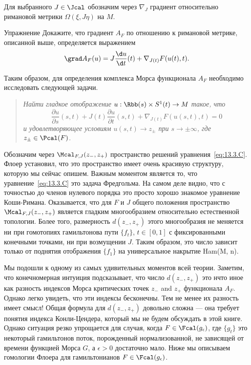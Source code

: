 Для выбранного $J\in\Jcal$ обозначим через $\nabla_{J}$ градиент
относительно римановой метрики $\Omega(\xi,J\eta)$ на $M$.
\begin{ex}{Упражнение}\label{13.3.B}
  Докажите, что градиент $A_{F}$ по отношению к римановой метрике,
  описанной выше, определяется выражением 
  \[
  \grad A_{F}(u)=J\frac{\d u}{\d t}(t)+\nabla_{J(t)}F(u(t),t).
  \]
\end{ex}
Таким образом, для определения комплекса Морса функционала $A_{F}$
необходимо исследовать  следующей задачи.
\begin{quote}\em
  Найти гладкое отображение $u : \Rbb(s)\times S^{1}(t)\to M$ такое,
  что
  \begin{equation}\label{eq:13.3.C}
    \frac{\partial u}{\partial s}(s,t) +
    J(t)\frac{\partial u}{\partial t}(s,t) +
    \nabla_{J(t)}F(u(s,t),t) = 0
  \end{equation}
  и удовлетворяющее условиям $u(s,t)\to z_{\pm}$ при $s\to\pm\infty$,
  где $z_{\pm}\in\Pcal(F)$.
\end{quote}
Обозначим через $\Mcal_{F,J}(z_{-},z_{+})$ пространство решений
уравнения~\ref{eq:13.3.C}. 
Флоер установил, что это пространство имеет очень красивую структуру,
которую мы сейчас опишем.
Важным моментом является то, что уравнение~\ref{eq:13.3.C} это задача Фредгольма.
На самом деле видно, что с точностью до членов нулевого порядка это
просто хорошо знакомое уравнение Коши-Римана. 
Оказывается, что для $F$ и $J$ общего положения пространство
$\Mcal_{F,J}(z_{-},z_{+})$ является гладким многообразием относительно
естественной топологии. 
Более того, размерность $d(z_{-}, z_{+})$ этого многообразия не
меняется ни при гомотопиях гамильтонова пути $\{f_{t}\}$, $t\in [0,1]$
с фиксированными конечными точками, ни при возмущении $J$.
Таким образом, это число зависит только от поднятия отображения
$\{f_{1}\}$ на универсальное накрытие Ham(M, n).

Мы подошли к одному из самых удивительных моментов всей теории.
Заметим, что конечномерная интуиция подсказывает, что число $d(z_{-},
z_{+})$ это нчто иное как разность индексов Морса критических точек
$z_{-}$ and $z_{+}$ функционала $A_{F}$.
Однако легко увидеть, что эти индексы бесконечны.
Тем не менее их разность имеет смысл! Общая формула для
$d(z_{-},z_{+})$ довольно сложна --- она требует понятия индекса
Конли-Цендера, который мы не будем обсуждать в этой книге.
Однако ситуация резко упрощается для случая, когда
$F\in\Fcal(g_{\epsilon})$, где $\{g_{t}\}$ это некоторый гамильтонов
поток, порожденный нормализованной, не зависящей от времени функцией
Морса $G$, а $\epsilon>0$ достаточно мало.
Ниже мы описываем гомологии Флоера для гамильтонианов
$F\in\Fcal(g_{\epsilon})$.

